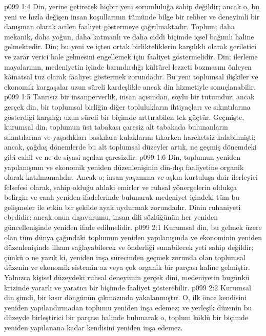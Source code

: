 \vs p099 1:4 Din, yerine getirecek hiçbir yeni sorumluluğa sahip değildir; ancak o, bu yeni ve hızla değişen insan koşullarının tümünde bilge bir rehber ve deneyimli bir danışman olarak acilen faaliyet göstermeye çağrılmaktadır. Toplum; daha mekanik, daha yoğun, daha katmanlı ve daha ciddi biçimde içsel bağımlı haline gelmektedir. Din; bu yeni ve içten ortak birlikteliklerin karşılıklı olarak geriletici ve zarar verici hale gelmesini engellemek için faaliyet göstermelidir. Din; ilerleme mayalarının, medeniyetin içinde barındırdığı kültürel lezzeti bozmasını önleyen kâinatsal tuz olarak faaliyet göstermek zorundadır. Bu yeni toplumsal ilişkiler ve ekonomik kargaşalar uzun süreli kardeşlikle ancak din hizmetiyle sonuçlanabilir.
\vs p099 1:5 Tanrısız bir insanperverlik, insan açısından, soylu bir tutumdur; ancak gerçek din, bir toplumsal birliğin diğer toplulukların ihtiyaçları ve sıkıntılarına gösterdiği karşılığı uzun süreli bir biçimde arttırabilen tek güçtür. Geçmişte, kurumsal din, toplumun üst tabakası çaresiz alt tabakada bulunanların sıkıntılarına ve yaşadıkları baskılara kulaklarını tıkarken hareketsiz kalabilmişti; ancak, çağdaş dönemlerde bu alt toplumsal düzeyler artık, ne geçmiş dönemdeki gibi cahil ve ne de siyasi açıdan çaresizdir.
\vs p099 1:6 Din, toplumun yeniden yapılanışının ve ekonomik yeniden düzenlenişinin din\hyp{}dışı faaliyetine organik olarak katılmamalıdır. Ancak o; insan yaşamına ve aşkın kurtuluşa dair ilerleyici felsefesi olarak, sahip olduğu ahlaki emirler ve ruhsal yönergelerin oldukça belirgin ve canlı yeniden ifadelerinde bulunarak medeniyet içindeki tüm bu gelişmeler ile etkin bir şekilde ayak uydurmak zorundadır. Dinin ruhaniyeti ebedidir; ancak onun dışavurumu, insan dili sözlüğünün her yeniden güncellenişinde yeniden ifade edilmelidir.
\vs p099 2:1 Kurumsal din, bu gelmek üzere olan tüm dünya çağındaki toplumun yeniden yapılanışında ve ekonominin yeniden düzenlenişinde ilham sağlayabilecek ve önderliği sunabilecek yeti sahip değildir; çünkü o ne yazık ki, yeniden inşa sürecinden geçmek zorunda olan toplumsal düzenin ve ekonomik sistemin az veya çok organik bir parçası haline gelmiştir. Yalnızca kişisel düzeydeki ruhsal deneyimin gerçek dini, medeniyetin bugünkü krizinde yararlı ve yaratıcı bir biçimde faaliyet gösterebilir.
\vs p099 2:2 Kurumsal din şimdi, bir kısır döngünün çıkmazında yakalanmıştır. O, ilk önce kendisini yeniden yapılandırmadan toplumu yeniden inşa edemez; ve yerleşik düzenin bu düzeyde birleştirici bir parçası halinde bulunarak o, toplum köklü bir biçimde yeniden yapılanana kadar kendisini yeniden inşa edemez.

